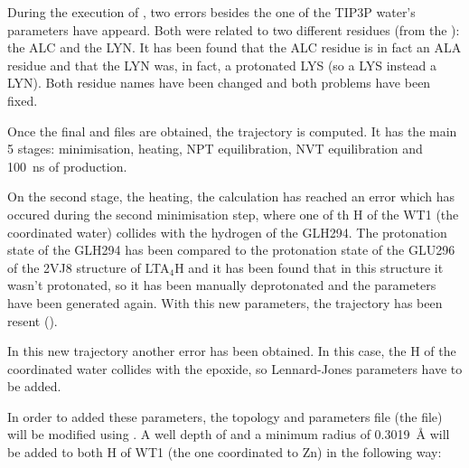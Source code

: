 		During the execution of \tleap{}, two errors besides the one of the TIP3P water's parameters have appeard. Both were related to two different residues (from the ): the ALC and the LYN. It has been found that the ALC residue is in fact an ALA residue and that the LYN was, in fact, a protonated LYS (so a LYS instead a LYN). Both residue names have been changed and both problems have been fixed.
		
		Once the final  and  files are obtained, the trajectory is computed. It has the main 5 stages: minimisation, heating, NPT equilibration, NVT equilibration and 100~ns of production.
	
		
		
		On the second stage, the heating, the calculation has reached an error which has occured during the second minimisation step, where one of th H of the WT1 (the coordinated water) collides with the hydrogen of the GLH294. The protonation state of the GLH294 has been compared to the protonation state of the GLU296 of the 2VJ8 structure of LTA$_4$H and it has been found that in this structure it wasn't protonated, so it has been manually deprotonated and the parameters have been generated again. With this new parameters, the trajectory has been resent ().
		
		
		In this new trajectory another error has been obtained. In this case, the H of the coordinated water collides with the epoxide, so Lennard-Jones parameters have to be added. 
		
		In order to added these parameters, the topology and parameters file (the  file) will be modified using \parmed. A well depth of  and a minimum radius of 0.3019~\AA{} will be added to both H of WT1 (the one coordinated to Zn) in the following way:
		
		
